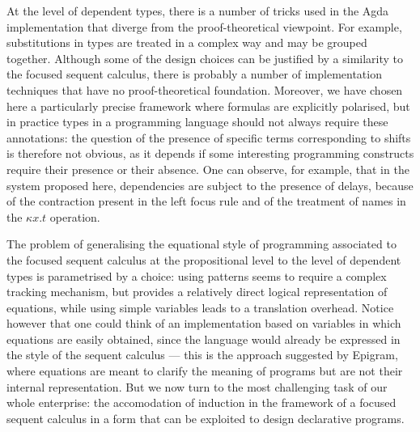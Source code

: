 \documentclass[creativecommons]{eptcs/eptcs}
\begin{document}
At the level of dependent types, there is a number of tricks used in the
Agda implementation that diverge from the proof-theoretical viewpoint. For
example, substitutions in types are treated in a complex way and may be
grouped together. Although some of the design choices can be justified by
a similarity to the focused sequent calculus, there is probably a number of
implementation techniques that have no proof-theoretical foundation.
Moreover, we have chosen here a particularly precise framework where
formulas are explicitly polarised, but in practice types in a programming
language should not always require these annotations: the question of the
presence of specific terms corresponding to shifts is therefore not obvious,
as it depends if some interesting programming constructs require their
presence or their absence. One can observe, for example, that in the system
proposed here, dependencies are subject to the presence of delays, because
of the contraction present in the left focus rule and of the treatment of
names in the $\kappa x.t$ operation.

The problem of generalising the equational style of programming associated
to the focused sequent calculus at the propositional level to the level of
dependent types is parametrised by a choice: using patterns seems to require
a complex tracking mechanism, but provides a relatively direct logical
representation of equations, while using simple variables leads to a translation
overhead. Notice however that one could think of an implementation based on
variables in which equations are easily obtained, since the language would
already be expressed in the style of the sequent calculus --- this is the
approach suggested by Epigram, where equations are meant to clarify the
meaning of programs but are not their internal representation. But we now
turn to the most challenging task of our whole enterprise: the accomodation
of induction in the framework of a focused sequent calculus in a form that
can be exploited to design declarative programs.
\end{document}
